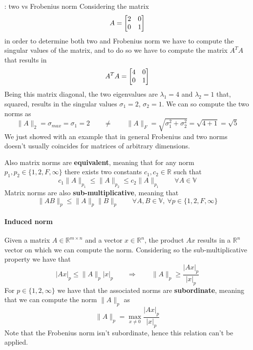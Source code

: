 	\begin{example}{: two vs Frobenius norm}
		Considering the matrix
		\[ A = \begin{bmatrix}  2 & 0 \\ 0 & 1 \end{bmatrix} \] 
		in order to determine both two and Frobenius norm we have to compute the singular values of the matrix, and to do so we have to compute the matrix $A^TA$ that results in
		\[ A^TA = \begin{bmatrix} 4 & 0 \\ 0 & 1 \end{bmatrix} \]
		Being this matrix diagonal, the two eigenvalues are $\lambda_1 = 4$ and $\lambda_2 = 1$ that, squared, results in the singular values $\sigma_1 = 2$, $\sigma_2 = 1$. We can so compute the two norms as
		\[ \| A\|_2 = \sigma_{max} = \sigma_1 = 2 \qquad \neq \qquad \|A\|_F = \sqrt{\sigma_1^2 + \sigma_2^2} = \sqrt{4 + 1} = \sqrt 5 \]
		We just showed with an example that in general Frobenius and two norms doesn't usually coincides for matrices of arbitrary dimensions.
	\end{example}
		
	Also matrix norms are \textbf{equivalent}, meaning that for any norm $p_1,p_2 \in \{ 1,2,F,\infty\}$ there exists two constants $c_1,c_2\in \mathds R$ such that
	\[ c_1 \|A\|_{p_1} \leq \|A\|_{p_2} \leq c_2 \|A\|_{p_1} \qquad \forall A \in \mathds V \]
	Matrix norms are also \textbf{sub-multiplicative}, meaning that
	\[ \|A B\|_p \leq \|A\|_p \|B\|_p \qquad \forall A,B\in \mathds V,\ \forall p \in \{1,2,F,\infty\} \]
	
	\paragraph{Induced norm} Given a matrix $A \in \mathds R^{m\times n}$ and a vector $x \in \mathds R^{n}$, the product $A x$ results in a $\mathds R^n$ vector on which we can compute the norm. Considering so the sub-multiplicative property we have that
	\[ | A x|_p \leq \|A\|_p |x|_p \qquad \Rightarrow \qquad \|A\|_p \geq \frac{|A x|_p}{|x|_p} \]
	For $p\in \{ 1,2,\infty\}$ we have that the associated norms are \textbf{subordinate}, meaning that we can compute the norm $\|A\|_p$ as
	\begin{equation}
		\|A\|_p = \max_{x\neq0} \frac{|Ax|_p}{|x|_p}
	\end{equation}
	Note that the Frobenius norm isn't subordinate, hence this relation can't be applied.
	
